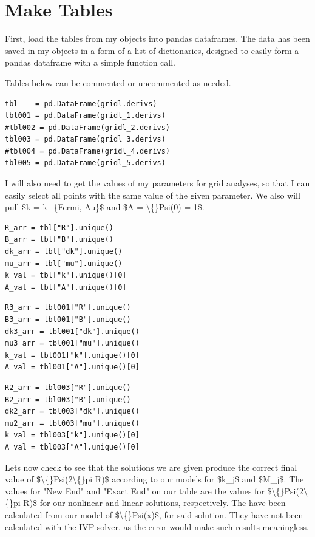 \documentclass{article}
\begin{document}
\section{Make Tables}

First, load the tables from my objects into pandas dataframes. The data has been saved in my objects in a form of a list of dictionaries, designed to easily form a pandas dataframe with a simple function call.

Tables below can be commented or uncommented as needed.

\begin{lstlisting}
tbl    = pd.DataFrame(gridl.derivs)
tbl001 = pd.DataFrame(gridl_1.derivs)
#tbl002 = pd.DataFrame(gridl_2.derivs)
tbl003 = pd.DataFrame(gridl_3.derivs)
#tbl004 = pd.DataFrame(gridl_4.derivs)
tbl005 = pd.DataFrame(gridl_5.derivs)\end{lstlisting}

I will also need to get the values of my parameters for grid analyses, so that I can easily select all points with the same value of the given parameter. We also will pull \$k  = k\_\{Fermi, Au\}\$ and \$A = \textbackslash\{\}Psi(0) = 1\$.

\begin{lstlisting}
R_arr = tbl["R"].unique()
B_arr = tbl["B"].unique()
dk_arr = tbl["dk"].unique()
mu_arr = tbl["mu"].unique()
k_val = tbl["k"].unique()[0]
A_val = tbl["A"].unique()[0]\end{lstlisting}

\begin{lstlisting}
R3_arr = tbl001["R"].unique()
B3_arr = tbl001["B"].unique()
dk3_arr = tbl001["dk"].unique()
mu3_arr = tbl001["mu"].unique()
k_val = tbl001["k"].unique()[0]
A_val = tbl001["A"].unique()[0]\end{lstlisting}

\begin{lstlisting}
R2_arr = tbl003["R"].unique()
B2_arr = tbl003["B"].unique()
dk2_arr = tbl003["dk"].unique()
mu2_arr = tbl003["mu"].unique()
k_val = tbl003["k"].unique()[0]
A_val = tbl003["A"].unique()[0]\end{lstlisting}

Lets now check to see that the solutions we are given produce the correct final value of \$\textbackslash\{\}Psi(2\textbackslash\{\}pi R)\$ according to our models for \$k\_j\$ and \$M\_j\$. The values for "New End" and "Exact End" on our table are the values for \$\textbackslash\{\}Psi(2\textbackslash\{\}pi R)\$ for our nonlinear and linear solutions, respectively. The have been calculated from our model of \$\textbackslash\{\}Psi(x)\$, for said solution. They have not been calculated with the IVP solver, as the error would make such results meaningless. 
\end{document}
